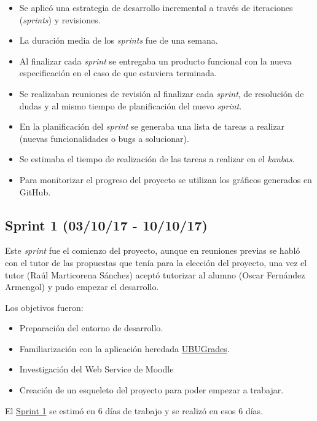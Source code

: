 \begin{itemize}
	\tightlist
	\item
	Se aplicó una estrategia de desarrollo incremental a través de
	iteraciones (\emph{sprints}) y revisiones.
	\item
	La duración media de los \emph{sprints} fue de una semana.
	\item
	Al finalizar cada \emph{sprint} se entregaba un producto funcional con la nueva especificación en el caso de que estuviera terminada.
	\item
	Se realizaban reuniones de revisión al finalizar cada \emph{sprint}, de resolución de dudas y
	al mismo tiempo de planificación del nuevo \emph{sprint}.
	\item
	En la planificación del \emph{sprint} se generaba una lista de tareas a realizar (nuevas funcionalidades o bugs a solucionar).
	\item
	Se estimaba el tiempo de realización de las tareas a realizar en el \emph{kanbas}.
	\item
	Para monitorizar el progreso del proyecto se utilizan los gráficos generados en GitHub.
	
\end{itemize}

\subsection{Sprint 1 (03/10/17 -
	10/10/17)}\label{sprint-1-0031017---101017}
Este \emph{sprint} fue el comienzo del proyecto, aunque en reuniones previas se habló con el tutor de las propuestas que tenía para la elección del proyecto, una vez el tutor (Raúl Marticorena Sánchez) aceptó tutorizar al alumno (Oscar Fernández Armengol) y pudo empezar el desarrollo.

Los objetivos fueron:
\begin{itemize}
	\tightlist
	\item
	Preparación del entorno de desarrollo.
	\item
	Familiarización con la aplicación heredada \href{https://github.com/claumartinezh/TFG_UBUGrades}{UBUGrades}.
	\item
	Investigación del Web Service de Moodle
	\item
	Creación de un esqueleto del proyecto para poder empezar a trabajar.
	
\end{itemize}
El \href{https://github.com/trona85/GII-17.1B-UBULog-1.0/milestone/1?closed=1}{Sprint 1} se estimó en 6 días de trabajo y se realizó en esos 6 días.

